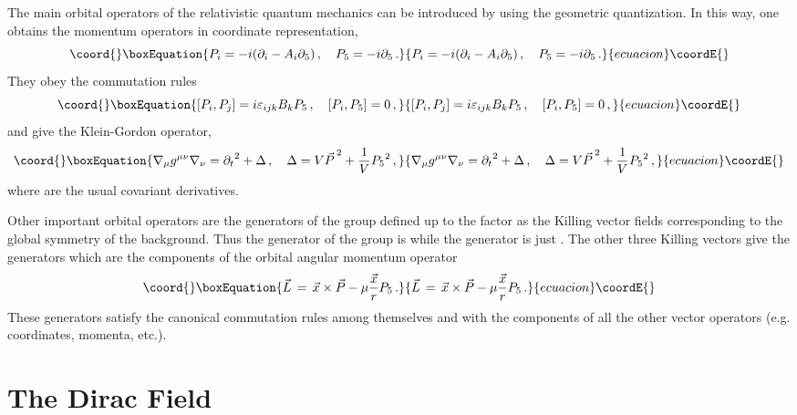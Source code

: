 \documentclass[a4paper,12pt]{article}
\begin{document}
The main orbital operators of the relativistic quantum mechanics  can be 
introduced by using the geometric quantization. In this way, one obtains  
the  momentum operators in coordinate representation, 
\begin{equation}\coord{}\boxEquation{
P_{i}=-i(\partial_{i}-A_{i}\partial_{5})\,,\quad P_{5}=-i\partial_{5}\,.
}{
P_{i}=-i(\partial_{i}-A_{i}\partial_{5})\,,\quad P_{5}=-i\partial_{5}\,.
}{ecuacion}\coordE{}\end{equation} 
They obey the commutation rules
\begin{equation}\coord{}\boxEquation{
[P_{i},P_{j}]=i\varepsilon_{ijk}B_{k}P_{5}\,,\quad
[P_{i},P_{5}]=0\,,
}{
[P_{i},P_{j}]=i\varepsilon_{ijk}B_{k}P_{5}\,,\quad
[P_{i},P_{5}]=0\,,
}{ecuacion}\coordE{}\end{equation}
and give the Klein-Gordon operator,   
\begin{equation}\coord{}\boxEquation{
\nabla_{\mu}g^{\mu\nu}\nabla_{\nu}=
{\partial_{t}}^{2}+\Delta\,,\quad
\Delta= V{\vec{P}\,}^{2}+\frac{1}{V}{P_{5}}^{2}\,,
}{
\nabla_{\mu}g^{\mu\nu}\nabla_{\nu}=
{\partial_{t}}^{2}+\Delta\,,\quad
\Delta= V{\vec{P}\,}^{2}+\frac{1}{V}{P_{5}}^{2}\,,
}{ecuacion}\coordE{}\end{equation}
where \myHighlight{$\nabla_{\mu}$}\coordHE{} are the usual covariant derivatives.

Other important orbital operators are the generators of the group \coordHE{} 
defined up to the factor \coordHE{} as  the Killing vector fields corresponding to 
the global symmetry of the background. Thus the generator of the group 
\coordHE{} is \coordHE{} while the \coordHE{} generator is just \coordHE{}.  
The other three Killing vectors give the \coordHE{} generators 
which are the components of the orbital angular momentum operator 
\begin{equation}\coord{}\boxEquation{\label{(angmom)}
\vec{L}\,=\,\vec{x}\times\vec{P}-\mu\frac{\vec{x}}{r}P_{5}\,.
}{\vec{L}\,=\,\vec{x}\times\vec{P}-\mu\frac{\vec{x}}{r}P_{5}\,.
}{ecuacion}\coordE{}\end{equation} 
These generators  satisfy the canonical commutation rules 
among themselves and with the components of all the other vector operators 
(e.g. coordinates,  momenta, etc.). 



\section{The Dirac Field}
\
\end{document}
